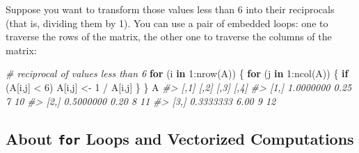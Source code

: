\documentclass[
]{book}
\newenvironment{Shaded}{\begin{snugshade}}{\end{snugshade}}
\newcommand{\CommentTok}[1]{\textcolor[rgb]{0.56,0.35,0.01}{\textit{#1}}}
\newcommand{\ControlFlowTok}[1]{\textcolor[rgb]{0.13,0.29,0.53}{\textbf{#1}}}
\newcommand{\DecValTok}[1]{\textcolor[rgb]{0.00,0.00,0.81}{#1}}
\newcommand{\FunctionTok}[1]{\textcolor[rgb]{0.00,0.00,0.00}{#1}}
\newcommand{\NormalTok}[1]{#1}
\newcommand{\OtherTok}[1]{\textcolor[rgb]{0.56,0.35,0.01}{#1}}
\newcommand{\SpecialCharTok}[1]{\textcolor[rgb]{0.00,0.00,0.00}{#1}}
\begin{document}
Suppose you want to transform those values less than 6 into their reciprocals
(that is, dividing them by 1). You can use a pair of embedded loops: one to
traverse the rows of the matrix, the other one to traverse the columns of the
matrix:

\begin{Shaded}
\begin{Highlighting}[]
\CommentTok{\# reciprocal of values less than 6}
\ControlFlowTok{for}\NormalTok{ (i }\ControlFlowTok{in} \DecValTok{1}\SpecialCharTok{:}\FunctionTok{nrow}\NormalTok{(A)) \{ }
  \ControlFlowTok{for}\NormalTok{ (j }\ControlFlowTok{in} \DecValTok{1}\SpecialCharTok{:}\FunctionTok{ncol}\NormalTok{(A)) \{}
    \ControlFlowTok{if}\NormalTok{ (A[i,j] }\SpecialCharTok{\textless{}} \DecValTok{6}\NormalTok{) A[i,j] }\OtherTok{\textless{}{-}} \DecValTok{1} \SpecialCharTok{/}\NormalTok{ A[i,j] }
\NormalTok{  \}}
\NormalTok{\}}
\NormalTok{A}
\CommentTok{\#\textgreater{}           [,1] [,2] [,3] [,4]}
\CommentTok{\#\textgreater{} [1,] 1.0000000 0.25    7   10}
\CommentTok{\#\textgreater{} [2,] 0.5000000 0.20    8   11}
\CommentTok{\#\textgreater{} [3,] 0.3333333 6.00    9   12}
\end{Highlighting}
\end{Shaded}

\hypertarget{about-for-loops-and-vectorized-computations}{%
\subsection{\texorpdfstring{About \texttt{for} Loops and Vectorized Computations}{About for Loops and Vectorized Computations}}\label{about-for-loops-and-vectorized-computations}}
\end{document}
